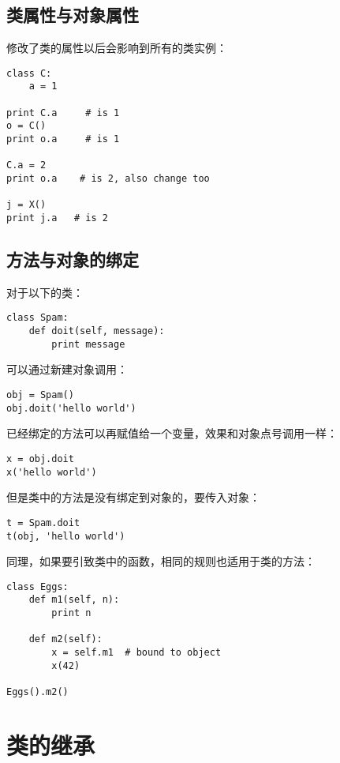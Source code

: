 \subsection{类属性与对象属性}

修改了类的属性以后会影响到所有的类实例：

\begin{lstlisting}
class C:
	a = 1

print C.a     # is 1
o = C()
print o.a     # is 1

C.a = 2
print o.a    # is 2, also change too

j = X()
print j.a   # is 2
\end{lstlisting}

\subsection{方法与对象的绑定}

对于以下的类：

\begin{lstlisting}
class Spam:
	def doit(self, message):
		print message
\end{lstlisting}

可以通过新建对象调用：

\begin{lstlisting}
obj = Spam()
obj.doit('hello world')
\end{lstlisting}

已经绑定的方法可以再赋值给一个变量，效果和对象点号调用一样：

\begin{lstlisting}
x = obj.doit
x('hello world')
\end{lstlisting}

但是类中的方法是没有绑定到对象的，要传入对象：

\begin{lstlisting}
t = Spam.doit
t(obj, 'hello world')
\end{lstlisting}

同理，如果要引致类中的函数，相同的规则也适用于类的方法：

\begin{lstlisting}
class Eggs:
	def m1(self, n):
		print n

	def m2(self):
		x = self.m1  # bound to object
		x(42)

Eggs().m2()
\end{lstlisting}

\section{类的继承}

